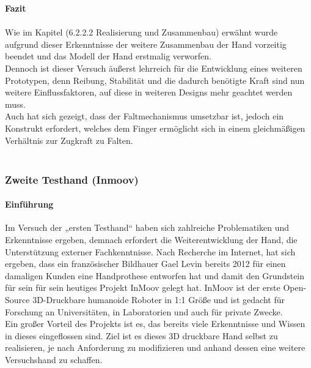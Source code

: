 \documentclass[titlepage,12pt,twoside]{article}
\begin{document}
\textbf{Fazit} \\
\\
Wie im Kapitel (6.2.2.2 Realisierung und Zusammenbau) erwähnt wurde aufgrund 
dieser Erkenntnisse der weitere Zusammenbau der Hand vorzeitig beendet und das 
Modell der Hand erstmalig verworfen. \\
Dennoch ist dieser Versuch äußerst lehrreich für die Entwicklung eines weiteren 
Prototypen, denn Reibung, Stabilität und die dadurch benötigte Kraft sind nun 
weitere Einflussfaktoren, auf diese in weiteren Designs mehr geachtet werden 
muss. \\
Auch hat sich gezeigt, dass der Faltmechanismus umsetzbar ist, jedoch ein Konstrukt 
erfordert, welches dem Finger ermöglicht sich in einem gleichmäßigen Verhältnis 
zur Zugkraft zu Falten. \\
\\

\subsubsection{Zweite Testhand (Inmoov)}
\label{chap:Zweite Testhand}
\paragraph{Einführung}
\hfill \break
\hfill \break
Im Versuch der „ersten Testhand“ haben sich zahlreiche Problematiken und 
Erkenntnisse ergeben, demnach erfordert die Weiterentwicklung der Hand, 
die Unterstützung externer Fachkenntnisse.
Nach Recherche im Internet, hat sich ergeben, dass ein französischer 
Bildhauer Gael Levin bereits 2012 für einen damaligen Kunden eine Handprothese 
entworfen hat und damit den Grundstein für sein für sein heutiges Projekt 
InMoov gelegt hat. InMoov ist der erste Open-Source 3D-Druckbare humanoide 
Roboter in 1:1 Größe und ist gedacht für Forschung an Universitäten, in 
Laboratorien und auch für private Zwecke. \\
Ein großer Vorteil des Projekts ist es, das bereits viele Erkenntnisse und 
Wissen in dieses eingeflossen sind. Ziel ist es dieses 3D druckbare Hand 
selbst zu realisieren, je nach Anforderung zu modifizieren und anhand dessen 
eine weitere Versuchshand zu schaffen. \\
\\
\end{document}
